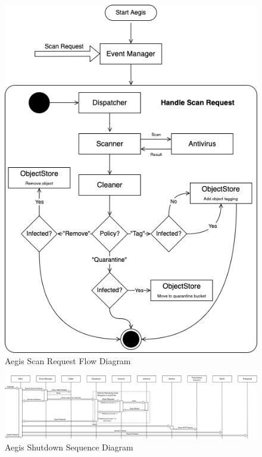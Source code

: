 \documentclass[12pt, conference, final, a4paper, onecolumn, compsoc]{IEEEtran}
\begin{document}
\begin{figure}[H]
  \centering \includegraphics[scale=0.5]{diagrams/flow-diagram.png}
  \caption{Aegis Scan Request Flow Diagram}
  \label{appendix:flow-diagram}
\end{figure}

\begin{figure}[H]
  \centering \includegraphics[scale=0.31]{diagrams/shutdown-sequence.png}
  \caption{Aegis Shutdown Sequence Diagram}
  \label{appendix:shutdown-sequence}
\end{figure}


\end{document}
